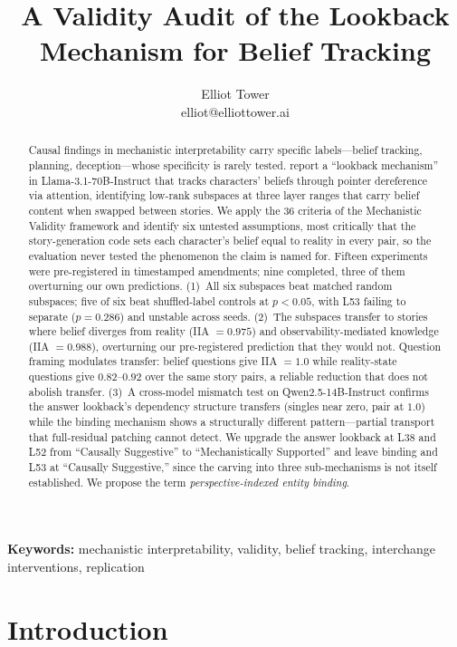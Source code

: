 \documentclass{article}
\title{A Validity Audit of the Lookback Mechanism for Belief Tracking}
\author{\name Elliot Tower \\
      \email elliot@elliottower.ai}
\begin{document}
\maketitle

\begin{abstract}
Causal findings in mechanistic interpretability carry specific labels---belief tracking, planning, deception---whose specificity is rarely tested. \citet{prakash2025lookback} report a ``lookback mechanism'' in Llama-3.1-70B-Instruct that tracks characters' beliefs through pointer dereference via attention, identifying low-rank subspaces at three layer ranges that carry belief content when swapped between stories. We apply the 36 criteria of the Mechanistic Validity framework and identify six untested assumptions, most critically that the story-generation code sets each character's belief equal to reality in every pair, so the evaluation never tested the phenomenon the claim is named for. Fifteen experiments were pre-registered in timestamped amendments; nine completed, three of them overturning our own predictions. (1)~All six subspaces beat matched random subspaces; five of six beat shuffled-label controls at $p < 0.05$, with L53 failing to separate ($p = 0.286$) and unstable across seeds. (2)~The subspaces transfer to stories where belief diverges from reality (IIA $= 0.975$) and observability-mediated knowledge (IIA $= 0.988$), overturning our pre-registered prediction that they would not. Question framing modulates transfer: belief questions give IIA $= 1.0$ while reality-state questions give $0.82$--$0.92$ over the same story pairs, a reliable reduction that does not abolish transfer. (3)~A cross-model mismatch test on Qwen2.5-14B-Instruct confirms the answer lookback's dependency structure transfers (singles near zero, pair at $1.0$) while the binding mechanism shows a structurally different pattern---partial transport that full-residual patching cannot detect. We upgrade the answer lookback at L38 and L52 from ``Causally Suggestive'' to ``Mechanistically Supported'' and leave binding and L53 at ``Causally Suggestive,'' since the carving into three sub-mechanisms is not itself established. We propose the term \emph{perspective-indexed entity binding}.
\end{abstract}

\noindent\textbf{Keywords:} mechanistic interpretability, validity, belief tracking, interchange interventions, replication


\section{Introduction}
\label{sec:intro}
\end{document}
